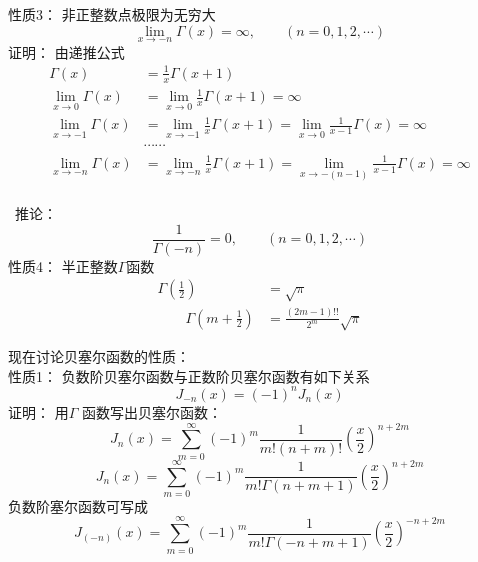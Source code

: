 \begin{frame}
	\alert{性质3：} 非正整数点极限为无穷大
	\begin{equation*}
		\lim\limits_{x\to -n }\Gamma(x)=\infty, \qquad (n=0,1,2, \cdots)
	\end{equation*}	
	\alert{证明：}  由递推公式
	\begin{equation*}
	\begin{split}
		\Gamma(x)&=\frac{1}{x} \Gamma(x+1) \\
		\lim\limits_{x\to 0 }	\Gamma(x)&=	\lim\limits_{x\to 0 } \frac{1}{x} \Gamma(x+1) =\infty \\
		\lim\limits_{x\to -1 }	\Gamma(x)&=\lim\limits_{x\to -1 } \frac{1}{x} \Gamma(x+1) =  \lim\limits_{x\to 0 } \frac{1}{x-1} \Gamma(x) =\infty \\
		& \cdots \cdots \\
		\lim\limits_{x\to -n }	\Gamma(x)&=\lim\limits_{x\to -n } \frac{1}{x} \Gamma(x+1) = \lim\limits_{x\to -(n-1) } \frac{1}{x-1} \Gamma(x) =\infty \\
	\end{split}
	\end{equation*}	
\end{frame}	

\begin{frame}
	 推论： 
	\begin{equation*}
		\frac{1}{\Gamma(-n)} =0, \qquad (n=0,1,2, \cdots)
	\end{equation*}	 \vspace{2cm}
	\alert{性质4：} 半正整数$\Gamma$函数 
	\begin{equation*}
		\begin{split}
		\Gamma(\frac{1}{2}) &=\sqrt{\pi} \\ 
		\qquad  \Gamma(m+\frac{1}{2}) &= \frac{(2m-1)!!}{2^m} \sqrt{\pi}
		\end{split}	
	\end{equation*}	
\end{frame}	

\begin{frame}
	现在讨论贝塞尔函数的性质：\\
	\alert{性质1：} 负数阶贝塞尔函数与正数阶贝塞尔函数有如下关系
	\begin{equation*}
		J_{-n}(x)=(-1)^n J_n(x)
	\end{equation*}	
	\alert{证明：}  
	用$\Gamma$ 函数写出贝塞尔函数：
	\begin{equation*}
		J_n(x) = \sum\limits_{m=0}^{\infty} (-1)^m  \frac{1}{m! (n+m) ! } (\frac{x}{2})^{n+2m} 
	\end{equation*}	
	\begin{equation*}
		J_n(x) = \sum\limits_{m=0}^{\infty} (-1)^m  \frac{1}{m! \Gamma(n+m+1) } (\frac{x}{2})^{n+2m} 
	\end{equation*}	
	负数阶塞尔函数可写成
	\begin{equation*}
		J_{(-n)}(x) = \sum\limits_{m=0}^{\infty} (-1)^m  \frac{1}{m! \Gamma(-n+m+1) } (\frac{x}{2})^{-n+2m} 
	\end{equation*}	
\end{frame}	

